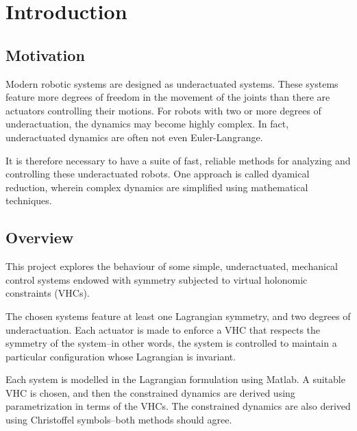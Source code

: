 \documentclass[main.tex]{subfiles}
\begin{document}
\chapter{Introduction}
\section{Motivation}
Modern robotic systems are designed as {underactuated} systems. These systems feature more degrees of freedom in the movement of the joints than there are actuators controlling their motions\cite{underactuated}. 
For robots with two or more degrees of underactuation, the dynamics may become highly complex. In fact, underactuated dynamics are often not even Euler-Langrange\cite{mccarthy}.

It is therefore necessary to have a suite of fast, reliable methods for analyzing and controlling these underactuated robots. One approach is called dyamical reduction, wherein complex dynamics are simplified using mathematical techniques.
\section{Overview}
This project explores the behaviour of some simple, underactuated, mechanical control systems endowed with symmetry subjected to virtual holonomic constraints (VHCs). 

The chosen systems feature at least one Lagrangian symmetry, and two degrees of underactuation. Each actuator is made to enforce a VHC that respects the symmetry of the system--in other words, the system is controlled to maintain a particular configuration whose Lagrangian is invariant.

Each system is modelled in the Lagrangian formulation using Matlab. A suitable VHC is chosen, and then the constrained dynamics are derived using parametrization in terms of the VHCs. The constrained dynamics are also derived using Christoffel symbols--both methods should agree.
\end{document}
